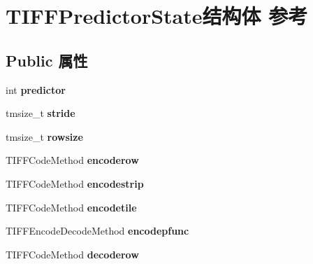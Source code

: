\hypertarget{struct_t_i_f_f_predictor_state}{}\section{T\+I\+F\+F\+Predictor\+State结构体 参考}
\label{struct_t_i_f_f_predictor_state}
\subsection*{Public 属性}
\begin{DoxyCompactItemize}
\item 
\mbox{\label{struct_t_i_f_f_predictor_state_a94144b4e8cc1b55ceed70965be5d38dc}} 
int {\bfseries predictor}
\item 
\mbox{\label{struct_t_i_f_f_predictor_state_a00e4b7be19730d12ecf7981c3c97c415}} 
tmsize\+\_\+t {\bfseries stride}
\item 
\mbox{\label{struct_t_i_f_f_predictor_state_a937ff8966ebc643915b1dcdd24eaa0f7}} 
tmsize\+\_\+t {\bfseries rowsize}
\item 
\mbox{\label{struct_t_i_f_f_predictor_state_a46f13792ede0738ee2d7355cf79c55f8}} 
T\+I\+F\+F\+Code\+Method {\bfseries encoderow}
\item 
\mbox{\label{struct_t_i_f_f_predictor_state_a77105f6fe542d08b1cf8c7c7cecdfcc2}} 
T\+I\+F\+F\+Code\+Method {\bfseries encodestrip}
\item 
\mbox{\label{struct_t_i_f_f_predictor_state_a5f3aa960d5ed14a4517adb9198aab19f}} 
T\+I\+F\+F\+Code\+Method {\bfseries encodetile}
\item 
\mbox{\label{struct_t_i_f_f_predictor_state_ac90113e4d990336d23f61bfeb719f335}} 
T\+I\+F\+F\+Encode\+Decode\+Method {\bfseries encodepfunc}
\item 
\mbox{\label{struct_t_i_f_f_predictor_state_aa7c48038e5c53d66eec1f8ba3963d6e2}} 
T\+I\+F\+F\+Code\+Method {\bfseries decoderow}

\end{DoxyCompactItemize}
